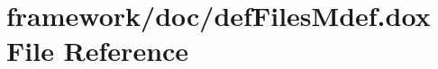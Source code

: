\hypertarget{def_files_mdef_8dox}{}\section{framework/doc/def\+Files\+Mdef.dox File Reference}
\label{def_files_mdef_8dox}
